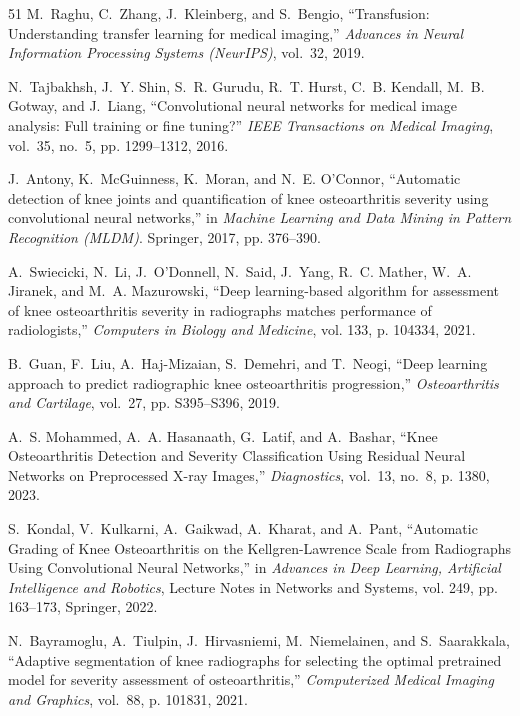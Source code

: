 \documentclass[10pt,journal]{IEEEtran}
\begin{document}
\begin{thebibliography}{51}
M.~Raghu, C.~Zhang, J.~Kleinberg, and S.~Bengio, ``Transfusion: Understanding transfer learning for medical imaging,'' \emph{Advances in Neural Information Processing Systems (NeurIPS)}, vol.~32, 2019.

N.~Tajbakhsh, J.~Y. Shin, S.~R. Gurudu, R.~T. Hurst, C.~B. Kendall, M.~B. Gotway, and J.~Liang, ``Convolutional neural networks for medical image analysis: Full training or fine tuning?'' \emph{IEEE Transactions on Medical Imaging}, vol.~35, no.~5, pp. 1299--1312, 2016.

J.~Antony, K.~McGuinness, K.~Moran, and N.~E. O'Connor, ``Automatic detection of knee joints and quantification of knee osteoarthritis severity using convolutional neural networks,'' in \emph{Machine Learning and Data Mining in Pattern Recognition (MLDM)}. Springer, 2017, pp. 376--390.

A.~Swiecicki, N.~Li, J.~O'Donnell, N.~Said, J.~Yang, R.~C. Mather, W.~A. Jiranek, and M.~A. Mazurowski, ``Deep learning-based algorithm for assessment of knee osteoarthritis severity in radiographs matches performance of radiologists,'' \emph{Computers in Biology and Medicine}, vol. 133, p. 104334, 2021.

B.~Guan, F.~Liu, A.~Haj-Mizaian, S.~Demehri, and T.~Neogi, ``Deep learning approach to predict radiographic knee osteoarthritis progression,'' \emph{Osteoarthritis and Cartilage}, vol.~27, pp. S395--S396, 2019.

A.~S. Mohammed, A.~A. Hasanaath, G.~Latif, and A.~Bashar, ``Knee Osteoarthritis Detection and Severity Classification Using Residual Neural Networks on Preprocessed X-ray Images,'' \emph{Diagnostics}, vol.~13, no.~8, p. 1380, 2023.

S.~Kondal, V.~Kulkarni, A.~Gaikwad, A.~Kharat, and A.~Pant, ``Automatic Grading of Knee Osteoarthritis on the Kellgren-Lawrence Scale from Radiographs Using Convolutional Neural Networks,'' in \emph{Advances in Deep Learning, Artificial Intelligence and Robotics}, Lecture Notes in Networks and Systems, vol. 249, pp. 163--173, Springer, 2022.

N.~Bayramoglu, A.~Tiulpin, J.~Hirvasniemi, M.~Niemelainen, and S.~Saarakkala, ``Adaptive segmentation of knee radiographs for selecting the optimal pretrained model for severity assessment of osteoarthritis,'' \emph{Computerized Medical Imaging and Graphics}, vol.~88, p. 101831, 2021.


\end{thebibliography}
\end{document}
